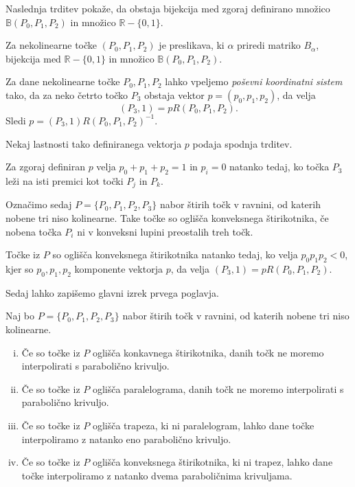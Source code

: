 \documentclass[mat1]{fmfdelo}
\newcommand{\R}{\mathbb R}
\newcommand{\B}{\mathbb B}
\newcommand{\al}{\alpha}
\begin{document}
Naslednja trditev pokaže, da obstaja bijekcija med zgoraj definirano množico $\B(P_0, P_1, P_2)$ in množico $\R - \{0, 1\}$.

\begin{trditev}
Za nekolinearne točke $(P_0, P_1, P_2)$ je preslikava, ki $\al$ priredi matriko $B_{\al}$, bijekcija med $\R - \{0, 1\}$ in množico $\B(P_0, P_1, P_2)$.
\end{trditev}

Za dane nekolinearne točke $P_0, P_1, P_2$ lahko vpeljemo \emph{poševni koordinatni sistem} tako, da za neko četrto točko $P_3$ obstaja vektor $p = (p_0, p_1, p_2)$, da velja
$$(P_3, 1) = p R(P_0, P_1, P_2).$$ Sledi $ p = (P_3, 1) R(P_0, P_1, P_2)^{-1}$.

Nekaj lastnosti tako definiranega vektorja $p$ podaja spodnja trditev.

\begin{trditev}
Za zgoraj definiran $p$ velja $p_0 + p_1 + p_2 = 1$ in $p_i = 0$ natanko tedaj, ko točka $P_3$ leži na isti premici kot točki $P_j$ in $P_k$. 
\end{trditev}

Označimo sedaj $P = \{ P_0, P_1, P_2, P_3 \}$ nabor štirih točk v ravnini, od katerih nobene tri niso kolinearne. Take točke so oglišča konveksnega štirikotnika, če nobena točka $P_i$ ni v konveksni lupini preostalih treh točk.

\begin{trditev}
Točke iz $P$ so oglišča konveksnega štirikotnika natanko tedaj, ko velja $p_0 p_1 p_2 < 0$, kjer so $p_0, p_1, p_2$ komponente vektorja $p$, da velja $(P_3, 1) = p R(P_0, P_1, P_2).$
\end{trditev}

Sedaj lahko zapišemo glavni izrek prvega poglavja.

\begin{izrek}
Naj bo $P = \{ P_0, P_1, P_2, P_3 \}$ nabor štirih točk v ravnini, od katerih nobene tri niso kolinearne.

\begin{enumerate}[i)]

\item Če so točke iz $P$ oglišča konkavnega štirikotnika, danih točk ne moremo interpolirati s parabolično krivuljo.

\item Če so točke iz $P$ oglišča paralelograma, danih točk ne moremo interpolirati s parabolično krivuljo.

\item Če so točke iz $P$ oglišča trapeza, ki ni paralelogram, lahko dane točke interpoliramo z natanko eno parabolično krivuljo.

\item Če so točke iz $P$ oglišča konveksnega štirikotnika, ki ni trapez, lahko dane točke interpoliramo z natanko dvema paraboličnima krivuljama.
\end{enumerate}

\end{izrek}
\end{document}
